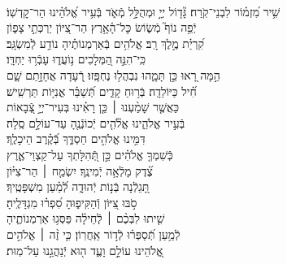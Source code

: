 \documentclass[twoside, openany, parskip=half, 11pt]{book}
\begin{document}
\\
\vspace{-1.5\baselineskip}
%
\begin{narrow}
שִׁ֥יר מִ֝זְמ֗וֹר לִבְנֵי־קֹֽרַח׃ \hfill \break
גָּ֘ד֤וֹל יְיָ֣ וּמְהֻלָּ֣ל מְֿאֹ֑ד \hfill בְּֿעִ֥יר אֱ֝לֹהֵ֗ינוּ הַר־קׇדְשֽׁוֹ׃ \\
יְֿפֵ֥ה נוֹף֮ מְֿשׂ֢וֹשׂ כׇּל־הָ֫אָ֥רֶץ \hfill הַר־צִ֭יּוֹן יַרְכְּתֵ֣י צָפ֑וֹן \\ קִ֝רְיַ֗ת מֶ֣לֶךְ רָֽב׃ \hfill
אֱלֹהִ֥ים בְּֿאַרְמְנוֹתֶ֗יהָ נוֹדַ֥ע לְֿמִשְׂגָּֽב׃ \\
כִּֽי־הִנֵּ֣ה הַ֭מְּלָכִים נ֥וֹעֲד֑וּ \hfill עָבְֿר֥וּ יַחְדָּֽו׃ \\
הֵ֣מָּה רָ֭אוּ כֵּ֣ן תָּמָ֑הוּ נִבְהֲל֥וּ נֶחְפָּֽזוּ׃ \hfill
רְֿ֭עָדָה אֲחָזָ֣תַם שָׁ֑ם \\ חִ֗֝יל כַּיּוֹלֵדָֽה׃ \hfill
בְּֿר֥וּחַ קָדִ֑ים תְּֿ֝שַׁבֵּ֗ר אֳנִיּ֥וֹת תַּרְשִֽׁישׁ׃ \\
כַּאֲשֶׁ֤ר שָׁמַ֨עְנוּ ׀ כֵּ֤ן רָאִ֗ינוּ \hfill בְּעִיר־יְיָ֣ צְֿ֭בָאוֹת \\ בְּֿעִ֣יר אֱלֹהֵ֑ינוּ \hfill אֱלֹ֘הִ֤ים יְֿכוֹנְֿנֶ֖הָ עַד־עוֹלָ֣ם סֶֽלָה׃ \\
דִּמִּ֣ינוּ אֱלֹהִ֣ים חַסְדֶּ֑ךָ \hfill בְּֿ֝קֶ֗רֶב הֵיכָלֶֽךָ׃ \\
כְּֿשִׁמְךָ֤ אֱלֹהִ֗ים \hfill כֵּ֣ן תְּֿ֭הִלָּתְךָ עַל־קַצְוֵי־אֶ֑רֶץ \\ צֶ֗֝דֶק מָלְֿאָ֥ה יְֿמִינֶֽךָ׃ \hfill
יִשְׂמַ֤ח ׀ הַר־צִיּ֗וֹן \\ תָּ֭גֵלְֿנָה בְּֿנ֣וֹת יְֿהוּדָ֑ה \hfill לְֿ֝מַ֗עַן מִשְׁפָּטֶֽיךָ׃ \\
סֹ֣בּוּ צִ֭יּוֹן וְֿהַקִּיפ֑וּהָ \hfill סִ֝פְר֗וּ מִגְדָּלֶֽיהָ׃ \\
שִׁ֤יתוּ לִבְּכֶ֨ם ׀ לְֽֿחֵילָ֗ה \hfill פַּסְּג֥וּ אַרְמְנוֹתֶ֑יהָ \\ לְֿמַ֥עַן תְּֿ֝סַפְּר֗וּ לְֿד֣וֹר אַֽחֲרֽוֹן׃ \hfill
כִּ֤י זֶ֨ה ׀ אֱלֹהִ֣ים \\ אֱ֭לֹהֵינוּ עוֹלָ֣ם \hfill וָעֶ֑ד ה֖וּא יְֿנַהֲגֵ֣נוּ עַל־מֽוּת׃
\end{narrow}

\enlargethispage{\baselineskip}
\end{document}
